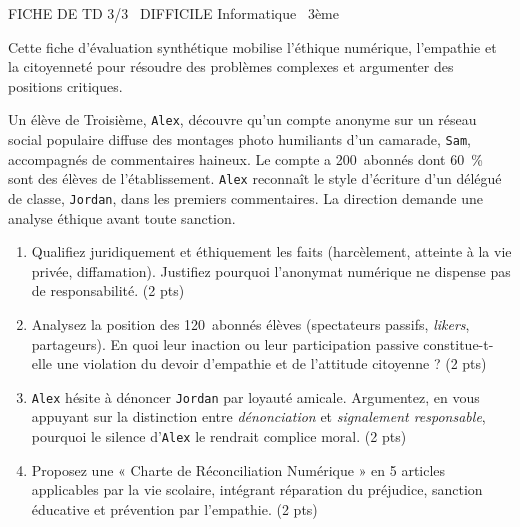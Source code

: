 \documentclass[11pt]{article}
\begin{document}
\begin{tcolorbox}[enhanced,colback=popink,colframe=popink,arc=10pt,boxrule=0pt,left=12pt,right=12pt,top=9pt,bottom=9pt]
{\color{white}\popxbold\small FICHE DE TD 3/3 \textbullet\ DIFFICILE \hfill Informatique \textbullet\ 3ème\par}
\end{tcolorbox}
\vspace{4pt}
Cette fiche d'évaluation synthétique mobilise l'éthique numérique, l'empathie et la citoyenneté pour résoudre des problèmes complexes et argumenter des positions critiques.

\begin{exercice}
Un élève de Troisième, \texttt{Alex}, découvre qu'un compte anonyme sur un réseau social populaire diffuse des montages photo humiliants d'un camarade, \texttt{Sam}, accompagnés de commentaires haineux. Le compte a \SI{200}{abonnés} dont \SI{60}{\%} sont des élèves de l'établissement. \texttt{Alex} reconnaît le style d'écriture d'un délégué de classe, \texttt{Jordan}, dans les premiers commentaires. La direction demande une analyse éthique avant toute sanction.
\begin{enumerate}
    \item Qualifiez juridiquement et éthiquement les faits (harcèlement, atteinte à la vie privée, diffamation). Justifiez pourquoi l'anonymat numérique ne dispense pas de responsabilité. (2 pts)
    \item Analysez la position des \SI{120}{abonnés} élèves (spectateurs passifs, \textit{likers}, partageurs). En quoi leur inaction ou leur participation passive constitue-t-elle une violation du devoir d'empathie et de l'attitude citoyenne ? (2 pts)
    \item \texttt{Alex} hésite à dénoncer \texttt{Jordan} par loyauté amicale. Argumentez, en vous appuyant sur la distinction entre \textit{dénonciation} et \textit{signalement responsable}, pourquoi le silence d'\texttt{Alex} le rendrait complice moral. (2 pts)
    \item Proposez une « Charte de Réconciliation Numérique » en 5 articles applicables par la vie scolaire, intégrant réparation du préjudice, sanction éducative et prévention par l'empathie. (2 pts)
\end{enumerate}
\end{exercice}
\end{document}
